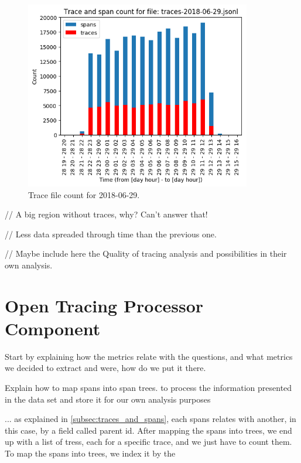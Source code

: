 \begin{figure}[H]
    \centering
    \includegraphics[width=0.88\textwidth]{images/trace_file_count_2018_06_29_chart.png}
    \caption{Trace file count for 2018-06-29.}
    \label{fig:trace_file_count_2018_06_29}
\end{figure}

// A big region without traces, why? Can't answer that!

// Less data spreaded through time than the previous one.

// Maybe include here the Quality of tracing analysis and possibilities in their own analysis.


\section{Open Tracing Processor Component}
\label{sec:open_tracing_processor_component}

Start by explaining how the metrics relate with the questions, and what metrics we decided to extract and were, how do we put it there.

Explain how to map spans into span trees.
to process the information presented in the data set and store it for our own analysis purposes

... as explained in \ref{subsec:traces_and_spans}, each spans relates with another, in this case, by a field called parent id. After mapping the spans into trees, we end up with a list of tress, each for a specific trace, and we just have to count them. To map the spans into trees, we index it by the 

